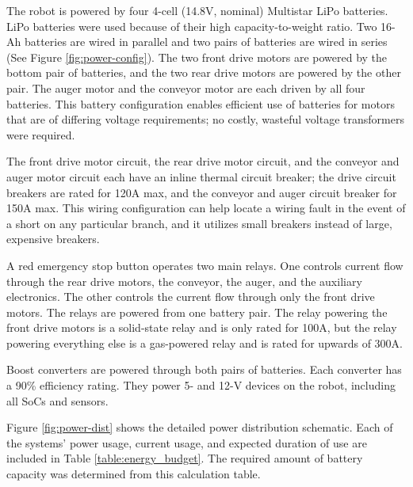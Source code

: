 \documentclass[class=article, crop=false]{standalone}
\begin{document}
	The robot is powered by four 4-cell (14.8V, nominal) Multistar LiPo batteries. LiPo batteries were used because of their high capacity-to-weight ratio. Two 16-Ah batteries are wired in parallel and two pairs of batteries are wired in series (See Figure \ref{fig:power-config}). The two front drive motors are powered by the bottom pair of batteries, and the two rear drive motors are powered by the other pair. The auger motor and the conveyor motor are each driven by all four batteries. This battery configuration enables efficient use of batteries for motors that are of differing voltage requirements; no costly, wasteful voltage transformers were required. 

	The front drive motor circuit, the rear drive motor circuit, and the conveyor and auger motor circuit each have an inline thermal circuit breaker; the drive circuit breakers are rated for 120A max, and the conveyor and auger circuit breaker for 150A max. This wiring configuration can help locate a wiring fault in the event of a short on any particular branch, and it utilizes small breakers instead of large, expensive breakers. 

	A red emergency stop button operates two main relays. One controls current flow through the rear drive motors, the conveyor, the auger, and the auxiliary electronics. The other controls the current flow through only the front drive motors. The relays are powered from one battery pair. The relay powering the front drive motors is a solid-state relay and is only rated for 100A, but the relay powering everything else is a gas-powered relay and is rated for upwards of 300A. 

	Boost converters are powered through both pairs of batteries. Each converter has a 90\% efficiency rating. They power 5- and 12-V devices on the robot, including all SoCs and sensors.
	
	Figure \ref{fig:power-dist} shows the detailed power distribution schematic. Each of the systems’ power usage, current usage, and expected duration of use are included in Table \ref{table:energy_budget}. The required amount of battery capacity was determined from this calculation table. 
	
\end{document}
